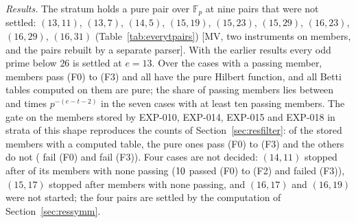 \documentclass[11pt]{article}
\theoremstyle{definition}
\theoremstyle{remark}
\newcommand{\EXP}[1]{\mbox{EXP-#1}}
\newcommand{\F}{\mathbb{F}}
\begin{document}
\begin{table}[htbp]
\centering\scriptsize

\caption{The cases of \EXP{019}: the family (K controls on settled pairs, X pairs with $e\le14$, Y pairs with $e=15,16$), the pair $(e,p)$, the exponent $t$, the number $e-t-2$ of conditions, the random members examined, those that pass (F0), (F0) and (F1), (F0) to (F2), (F0) to (F3) (which all have the pure Hilbert function), the Betti tables computed and the pure ones, and the status of the case: the early stop at $5$ pure members, a case not finished or a case not started.}
\label{tab:everyt}
\end{table}

\emph{Results.} The stratum holds a pure pair over $\F_p$ at nine pairs that were not settled: $(13,11)$, $(13,7)$, $(14,5)$, $(15,19)$, $(15,23)$, $(15,29)$, $(16,23)$, $(16,29)$, $(16,31)$ (Table~\ref{tab:everytpairs}) [MV, two instruments on \nevtSample{} members, and the pairs rebuilt by a separate parser]. With the earlier results every odd prime below $26$ is settled at $e=13$. Over the \nevtPassingCases{} cases with a passing member, \nevtPassed{} members pass (F0) to (F3) and all have the pure Hilbert function, and all \nevtTables{} Betti tables computed on them are pure; the share of passing members lies between \nevtRatioLow{} and \nevtRatioHigh{} times $p^{-(e-t-2)}$ in the seven cases with at least ten passing members. The gate on the members stored by \EXP{010}, \EXP{014}, \EXP{015} and \EXP{018} in strata of this shape reproduces the counts of Section~\ref{sec:resfilter}: of the \nevtStored{} stored members with a computed table, the \nevtStoredPure{} pure ones pass (F0) to (F3) and the \nevtStoredOther{} others do not (\nevtFailFZero{} fail (F0) and \nevtFailFThree{} fail (F3)). Four cases are not decided: $(14,11)$ stopped after \nevtFourteenElevenExamined{} of its members with none passing ($10$ passed (F0) to (F2) and failed (F3)), $(15,17)$ stopped after \nevtFifteenSeventeenExamined{} members with none passing, and $(16,17)$ and $(16,19)$ were not started; the four pairs are settled by the computation of Section~\ref{sec:ressymm}.

\begin{table}[htbp]
\centering\scriptsize

\caption{One pure pair over $\F_p$ at each of the nine pairs settled by \EXP{019}: the pair, the exponent $t$, the stratum, the forms and the length of $U/(Uf+Ug)$; the script checks the stratum of each pair and the stored table $(1,2,2,1)$ on $(0,e,3e,4e)$, and the two instruments agree.}
\label{tab:everytpairs}
\end{table}
\end{document}

